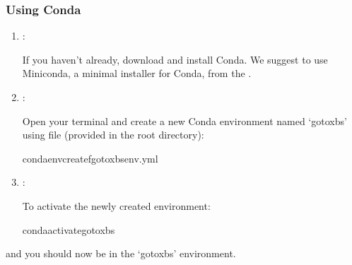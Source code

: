 \documentclass[letterpaper,10pt,english]{sphinxmanual}
\begin{document}
\subsubsection{Using Conda}
\label{\detokenize{quick_start:using-conda}}\begin{enumerate}
%
\item {} 
\sphinxAtStartPar
{}:

\sphinxAtStartPar
If you haven’t already, download and install Conda. We suggest to use Miniconda, a minimal installer for Conda, from the .

\item {} 
\sphinxAtStartPar
{}:

\sphinxAtStartPar
Open your terminal and create a new Conda environment named ‘goto\sphinxhyphen{}xbs’ using  file (provided in the root directory):

\begin{sphinxVerbatim}[commandchars=\\\{\}]
condaenvcreate\PYGZhy{}fgoto\PYGZhy{}xbs\PYGZhy{}env.yml
\end{sphinxVerbatim}

\item {} 
\sphinxAtStartPar
{}:

\sphinxAtStartPar
To activate the newly created environment:

\begin{sphinxVerbatim}[commandchars=\\\{\}]
condaactivategoto\PYGZhy{}xbs
\end{sphinxVerbatim}

\end{enumerate}

\sphinxAtStartPar
and you should now be in the ‘goto\sphinxhyphen{}xbs’ environment.
\end{document}
